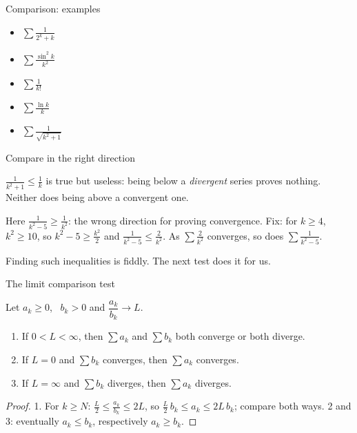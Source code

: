 \documentclass{wosm-slides}
\begin{document}
\begin{frame}{Comparison: examples}
  \begin{itemize}
    \item $\displaystyle\sum \frac{1}{2^k + k}$
    \item $\displaystyle\sum \frac{\sin^2 k}{k^2}$
    \item $\displaystyle\sum \frac{1}{k!}$
    \item $\displaystyle\sum \frac{\ln k}{k}$
    \item $\displaystyle\sum \frac{1}{\sqrt{k^2 + 1}}$
  \end{itemize}
\end{frame}

\begin{frame}{Compare in the right direction}
  \begin{warning}
    $\frac{1}{k^2 + 1} \le \frac{1}{k}$ is true but useless: being below a \emph{divergent}
    series proves nothing. Neither does being above a convergent one.
  \end{warning}
  \pause
  \begin{example}[$\sum_{k=3}^\infty \frac{1}{k^2 - 5}$]
    Here $\frac{1}{k^2 - 5} \ge \frac{1}{k^2}$: the wrong direction for proving convergence.
    \pause
    Fix: for $k \ge 4$, $k^2 \ge 10$, so $k^2 - 5 \ge \frac{k^2}{2}$ and
    $\frac{1}{k^2 - 5} \le \frac{2}{k^2}$. As $\sum \frac{2}{k^2}$ converges,
    so does $\sum \frac{1}{k^2 - 5}$.
  \end{example}
  \pause
  Finding such inequalities is fiddly. The next test does it for us.
\end{frame}

\begin{frame}{The limit comparison test}
  \begin{theorem}
    Let $a_k \ge 0$, \ $b_k > 0$ and $\dfrac{a_k}{b_k} \to L$.
    \begin{enumerate}
      \item If $0 < L < \infty$, then $\sum a_k$ and $\sum b_k$ both converge or both diverge.
      \item If $L = 0$ and $\sum b_k$ converges, then $\sum a_k$ converges.
      \item If $L = \infty$ and $\sum b_k$ diverges, then $\sum a_k$ diverges.
    \end{enumerate}
  \end{theorem}
  \pause
  \begin{proof}
    1. For $k \ge N$: $\frac L2 \le \frac{a_k}{b_k} \le 2L$, so
    $\frac L2\, b_k \le a_k \le 2L\, b_k$; compare both ways.
    2 and 3: eventually $a_k \le b_k$, respectively $a_k \ge b_k$.
  \end{proof}
\end{frame}
\end{document}
